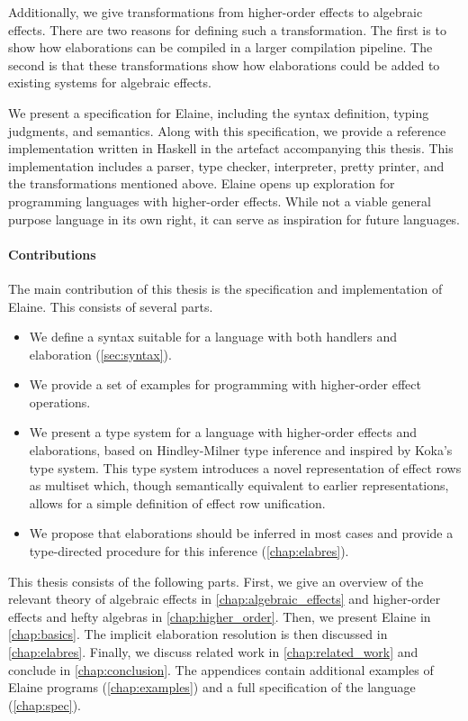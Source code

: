 Additionally, we give transformations from higher-order effects to algebraic effects. There are two reasons for defining such a transformation. The first is to show how elaborations can be compiled in a larger compilation pipeline. The second is that these transformations show how elaborations could be added to existing systems for algebraic effects.

We present a specification for Elaine, including the syntax definition, typing judgments, and semantics. Along with this specification, we provide a reference implementation written in Haskell in the artefact accompanying this thesis. This implementation includes a parser, type checker, interpreter, pretty printer, and the transformations mentioned above. Elaine opens up exploration for programming languages with higher-order effects. While not a viable general purpose language in its own right, it can serve as inspiration for future languages.

\paragraph{Contributions} The main contribution of this thesis is the specification and implementation of Elaine. This consists of several parts.
\begin{itemize}
    \item We define a syntax suitable for a language with both handlers and elaboration (\cref{sec:syntax}).
    \item We provide a set of examples for programming with higher-order effect operations.
    \item We present a type system for a language with higher-order effects and elaborations, based on Hindley-Milner type inference and inspired by Koka's type system. This type system introduces a novel representation of effect rows as multiset which, though semantically equivalent to earlier representations, allows for a simple definition of effect row unification.
    \item We propose that elaborations should be inferred in most cases and provide a type-directed procedure for this inference (\cref{chap:elabres}).
\end{itemize}
This thesis consists of the following parts. First, we give an overview of the relevant theory of algebraic effects in \cref{chap:algebraic_effects} and higher-order effects and hefty algebras in \cref{chap:higher_order}. Then, we present Elaine in \cref{chap:basics}. The implicit elaboration resolution is then discussed in \cref{chap:elabres}. Finally, we discuss related work in \cref{chap:related_work} and conclude in \cref{chap:conclusion}. The appendices contain additional examples of Elaine programs (\cref{chap:examples}) and a full specification of the language (\cref{chap:spec}).

